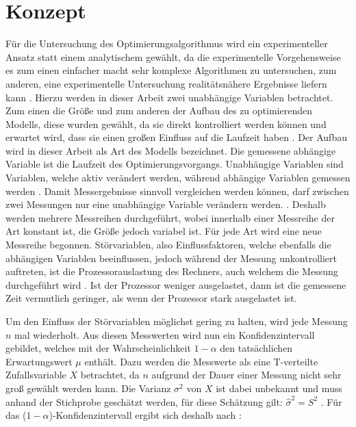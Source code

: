 \chapter{Konzept}

Für die Untersuchung des Optimierungsalgorithmus wird ein experimenteller
Ansatz statt einem analytischem gewählt, da die experimentelle Vorgehensweise
es zum einen einfacher macht sehr komplexe Algorithmen zu untersuchen, zum
anderen, eine experimentelle Untersuchung realitätsnähere Ergebnisse liefern
kann \autocite[vgl.][3]{ExperimentalMethods}. Hierzu werden in dieser Arbeit
zwei unabhängige Variablen betrachtet. Zum einen die Größe und zum anderen der
Aufbau des zu optimierenden Modells, diese wurden gewählt, da sie direkt
kontrolliert werden können und erwartet wird, dass sie einen großen Einfluss
auf die Laufzeit haben \autocite[vgl.][506]{ExperimentalAnalysis}. Der Aufbau
wird in dieser Arbeit als Art des Modells bezeichnet. Die gemessene abhängige
Variable ist die Laufzeit des Optimierungsvorgangs. Unabhängige Variablen sind
Variablen, welche aktiv verändert werden, während abhängige Variablen gemessen
werden \autocite[vgl.][236]{EmpirischeMethoden}. Damit Messergebnisse
sinnvoll vergleichen werden können, darf zwischen zwei Messungen nur eine
unabhängige Variable verändern werden. \autocite[vgl.][236]{EmpirischeMethoden}.
Deshalb werden mehrere Messreihen durchgeführt, wobei innerhalb einer Messreihe
der Art konstant ist, die Größe jedoch variabel ist. Für jede Art wird eine
neue Messreihe begonnen. Störvariablen, also Einflussfaktoren, welche ebenfalls
die abhängigen Variablen beeinflussen, jedoch während der Messung
unkontrolliert auftreten, ist \zB die Prozessorauslastung des Rechners, auch
welchem die Messung durchgeführt wird \autocite[vgl.][237]{EmpirischeMethoden}.
Ist der Prozessor weniger ausgelastet, dann ist die gemessene Zeit vermutlich
geringer, als wenn der Prozessor stark ausgelastet ist.

Um den Einfluss der Störvariablen möglichst gering zu halten, wird jede Messung
$n$ mal wiederholt. Aus diesen Messwerten wird nun ein Konfidenzintervall
gebildet, welches mit der Wahrscheinlichkeit $1 - \alpha$ den tatsächlichen
Erwartungswert $\mu$ enthält. Dazu werden die Messwerte als eine T-verteilte
Zufallsvariable $X$ betrachtet, da $n$ aufgrund der Dauer einer Messung nicht
sehr groß gewählt werden kann. Die Varianz $\sigma^2$ von $X$ ist dabei
unbekannt und muss anhand der Stichprobe geschätzt werden, für diese Schätzung
gilt: $\hat{\sigma}^2 = S^2$ \autocite[vgl][528]{Statistik}. Für das
($1-\alpha$)-Konfidenzintervall ergibt sich deshalb nach
\autocite[vgl.][533]{Statistik}:

